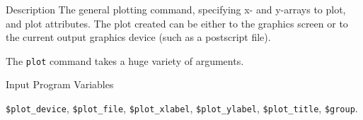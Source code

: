 
\begin{IFFcom}
\item[Description] The general plotting command, specifying x- and
  y-arrays to plot, and plot attributes.  The plot created can be either to
  the graphics screen or to the current output graphics device (such as a
  postscript file).
  
  The {\texttt{plot}} command takes a huge variety of arguments.
\item[Input Program Variables] 
  \begin{sloppypar} 
    {\tt{\$plot\_device}}, {\tt{\$plot\_file}}, {\tt{\$plot\_xlabel}},
    {\tt{\$plot\_ylabel}}, {\tt{\$plot\_title}}, {\tt{\$group}}.
  \end{sloppypar}


\end{IFFcom}
